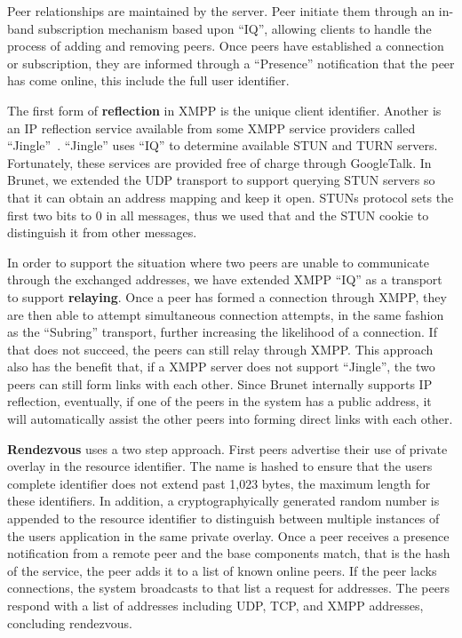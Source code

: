 \documentclass[conference]{IEEEtran}
\begin{document}
Peer relationships are maintained by the server.  Peer initiate them through an
in-band subscription mechanism based upon ``IQ'', allowing clients to handle
the process of adding and removing peers.  Once peers have established a
connection or subscription, they are informed through a ``Presence''
notification that the peer has come online, this include the full user
identifier.

The first form of \textbf{reflection} in XMPP is the unique client identifier.
Another is an IP reflection service available from some XMPP service providers
called ``Jingle''~\cite{jingle}.  ``Jingle'' uses ``IQ'' to determine available
STUN and TURN servers.  Fortunately, these services are provided free of charge
through GoogleTalk.  In Brunet, we extended the UDP transport to support
querying STUN servers so that it can obtain an address mapping and keep it
open.  STUNs protocol sets the first two bits to 0 in all messages, thus we
used that and the STUN cookie to distinguish it from other messages.

In order to support the situation where two peers are unable to communicate
through the exchanged addresses, we have extended XMPP ``IQ'' as a transport to
support \textbf{relaying}.  Once a peer has formed a connection through XMPP,
they are then able to attempt simultaneous connection attempts, in the same
fashion as the ``Subring'' transport, further increasing the likelihood of a
connection.  If that does not succeed, the peers can still relay through XMPP.
This approach also has the benefit that, if a XMPP server does not support
``Jingle'', the two peers can still form links with each other.  Since Brunet
internally supports IP reflection, eventually, if one of the peers in the system
has a public address, it will automatically assist the other peers into forming
direct links with each other.

\textbf{Rendezvous} uses a two step approach.  First peers advertise their use
of private overlay in the resource identifier.  The name is hashed to ensure
that the users complete identifier does not extend past 1,023 bytes, the
maximum length for these identifiers.  In addition, a cryptographyically
generated random number is appended to the resource identifier to distinguish
between multiple instances of the users application in the same private
overlay.  Once a peer receives a presence notification from a remote peer and
the base components match, that is the hash of the service, the peer adds it to
a list of known online peers.  If the peer lacks connections, the system
broadcasts to that list a request for addresses.  The peers respond with a list
of addresses including UDP, TCP, and XMPP addresses, concluding rendezvous.
\end{document}
